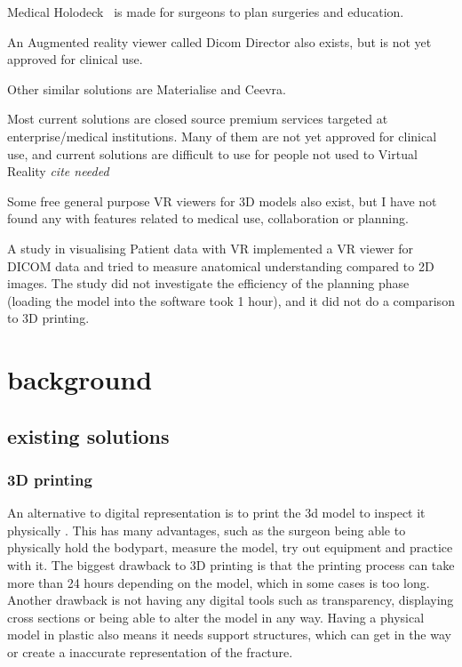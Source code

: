 \documentclass[12pt]{scrartcl}
\begin{document}
Medical Holodeck~\cite{medical_holodeck_medicalholodeck_nodate} is made for surgeons to plan surgeries and education.

An Augmented reality viewer called Dicom Director also exists, but is not yet approved for clinical use.\cite{dicomdirectorcom_surgeons_nodate}

Other similar solutions are Materialise\cite{materialise_medical_nodate} and
Ceevra\cite{ceevra_inc_using_2019}.

Most current solutions are closed source premium services targeted at enterprise/medical institutions. Many of them are not yet approved for clinical use, and current solutions are difficult to use for people not used to Virtual Reality \emph{cite needed}


Some free general purpose VR viewers for 3D models also exist, but I have not found any with features related to medical use, collaboration or planning.

A study in visualising Patient data with VR \cite{vertemati_virtual_2019} implemented a VR viewer for DICOM data and tried to measure anatomical understanding compared to 2D images. The study did not investigate the efficiency of the planning phase (loading the model into the software took 1 hour), and it did not do a comparison to 3D printing.

\section{ background }

\subsection{ existing solutions}


\subsubsection { 3D printing }

An alternative to digital representation is to print the 3d model to inspect it physically \cite{mishra_virtual_2019}. This has many advantages, such as the surgeon being able to physically hold the bodypart, measure the model, try out equipment and practice with it.
The biggest drawback to 3D printing is that the printing process can take more than 24 hours depending on the model, which in some cases is too long. Another drawback is not having any digital tools such as transparency, displaying cross sections or being able to alter the model in any way. Having a physical model in plastic also means it needs support structures, which can get in the way or create a inaccurate representation of the fracture.
\end{document}
